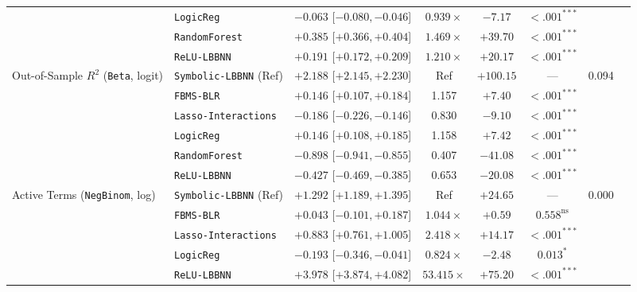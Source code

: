\begin{table}[htbp]
{{\begin{tabular}{llcccccc}
 & \texttt{LogicReg} & $-0.063$ [$-0.080, -0.046$] & $0.939\times$ & $-7.17$ & $<.001^{***}$ &  \\
 & \texttt{RandomForest} & $+0.385$ [$+0.366, +0.404$] & $1.469\times$ & $+39.70$ & $<.001^{***}$ &  \\
 & \texttt{ReLU-LBBNN} & $+0.191$ [$+0.172, +0.209$] & $1.210\times$ & $+20.17$ & $<.001^{***}$ &  \\
\midrule
Out-of-Sample $R^2$ (\texttt{Beta}, logit) & \texttt{Symbolic-LBBNN} (Ref) & $+2.188$ [$+2.145, +2.230$] & Ref & $+100.15$ & --- & 0.094 \\
 & \texttt{FBMS-BLR} & $+0.146$ [$+0.107, +0.184$] & 1.157 & $+7.40$ & $<.001^{***}$ &  \\
 & \texttt{Lasso-Interactions} & $-0.186$ [$-0.226, -0.146$] & 0.830 & $-9.10$ & $<.001^{***}$ &  \\
 & \texttt{LogicReg} & $+0.146$ [$+0.108, +0.185$] & 1.158 & $+7.42$ & $<.001^{***}$ &  \\
 & \texttt{RandomForest} & $-0.898$ [$-0.941, -0.855$] & 0.407 & $-41.08$ & $<.001^{***}$ &  \\
 & \texttt{ReLU-LBBNN} & $-0.427$ [$-0.469, -0.385$] & 0.653 & $-20.08$ & $<.001^{***}$ &  \\
\midrule
Active Terms (\texttt{NegBinom}, log) & \texttt{Symbolic-LBBNN} (Ref) & $+1.292$ [$+1.189, +1.395$] & Ref & $+24.65$ & --- & 0.000 \\
 & \texttt{FBMS-BLR} & $+0.043$ [$-0.101, +0.187$] & $1.044\times$ & $+0.59$ & $0.558^{\text{ns}}$ &  \\
 & \texttt{Lasso-Interactions} & $+0.883$ [$+0.761, +1.005$] & $2.418\times$ & $+14.17$ & $<.001^{***}$ &  \\
 & \texttt{LogicReg} & $-0.193$ [$-0.346, -0.041$] & $0.824\times$ & $-2.48$ & $0.013^{*}$ &  \\
 & \texttt{ReLU-LBBNN} & $+3.978$ [$+3.874, +4.082$] & $53.415\times$ & $+75.20$ & $<.001^{***}$ &  \\
\bottomrule
\end{tabular}%
}
}
\end{table}

